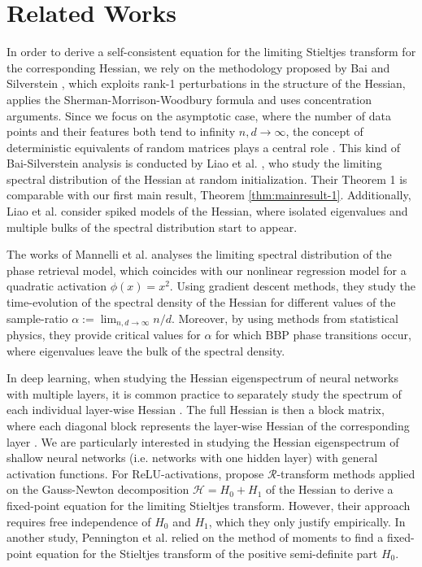 \documentclass{article}
\begin{document}
\section{Related Works}
In order to derive a self-consistent equation for the limiting Stieltjes transform for the corresponding Hessian, we rely on the methodology proposed by Bai and Silverstein \cite{bai}, which exploits rank-1 perturbations in the structure of the Hessian, applies the Sherman-Morrison-Woodbury formula and uses concentration arguments. Since we focus on the asymptotic case, where the number of data points and their features both tend to infinity $n,d\to\infty$, the concept of deterministic equivalents of random matrices plays a central role \cite{couillet}. This kind of Bai-Silverstein analysis is conducted by Liao et al. \cite{Liao}, who study the limiting spectral distribution of the Hessian at random initialization. Their Theorem 1 is comparable with our first main result, Theorem \ref{thm:mainresult-1}. Additionally, Liao et al. consider spiked models of the Hessian, where isolated eigenvalues and multiple bulks of the spectral distribution start to appear.
\bigskip
\par
The works of Mannelli et al. \cite{mannelli} analyses the limiting spectral distribution of the phase retrieval model, which coincides with our nonlinear regression model for a quadratic activation $\phi(x)=x^2$. Using gradient descent methods, they study the time-evolution of the spectral density of the Hessian for different values of the sample-ratio $\alpha:=\lim_{n,d\to\infty}n/d$. Moreover, by using methods from statistical physics, they provide critical values for $\alpha$ for which BBP phase transitions occur, where eigenvalues leave the bulk of the spectral density.
\bigskip
\par
In deep learning, when studying the Hessian eigenspectrum of neural networks with multiple layers, it is common practice to separately study the spectrum of each individual layer-wise Hessian \cite{wu, bahamou, sankar}. The full Hessian is then a block matrix, where each diagonal block represents the layer-wise Hessian of the corresponding layer \cite{kawaguchi}. We are particularly interested in studying the Hessian eigenspectrum of shallow neural networks (i.e. networks with one hidden layer) with general activation functions. For ReLU-activations, \cite{pennington} propose $\mathcal{R}$-transform methods applied on the Gauss-Newton decomposition $\mathcal{H}=H_0+H_1$ of the Hessian to derive a fixed-point equation for the limiting Stieltjes transform. However, their approach requires free independence of $H_0$ and $H_1$, which they only justify empirically. In another study, Pennington et al. \cite{pennington2} relied on the method of moments to find a fixed-point equation for the Stieltjes transform of the positive semi-definite part $H_0$.
\end{document}
